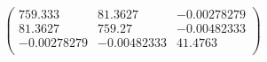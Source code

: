\documentclass{article}
\begin{document}
\[\left(
\begin{array}{ccc}
 759.333 & 81.3627 & -0.00278279 \\
 81.3627 & 759.27 & -0.00482333 \\
 -0.00278279 & -0.00482333 & 41.4763 \\
\end{array}
\right)\]
\end{document}
